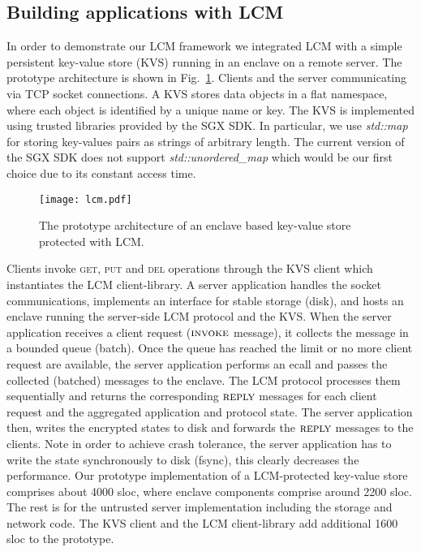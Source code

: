 \documentclass[11pt]{article}
\theoremstyle{plain-boldhead}
\theoremstyle{definition-boldhead}
\newcommand{\str}[1]{\textsc{#1}}
\newcommand{\pp}{LCM\xspace}
\begin{document}
\subsection{Building applications with LCM}
\label{impl:ss:aps}

In order to demonstrate our LCM framework we integrated LCM with a simple
persistent key-value store (KVS) running in an enclave on a remote server. The
prototype architecture is shown in Fig.~\ref{fig:lcm-proto}. Clients and the
server communicating via TCP socket connections.
% 
A KVS stores data objects in a flat namespace, where each object is identified
by a unique name or key.  The KVS is implemented using trusted libraries
provided by the \ac{SGX} SDK. In particular, we use \emph{std::map} for storing
key-values pairs as strings of arbitrary length.  The current version of the
\ac{SGX} SDK does not support \emph{std::unordered\_map} which would be our first
choice due to its constant access time.


\begin{figure}[ht]
    \centering
   \texttt{[image: lcm.pdf]}
    \caption{
    The prototype architecture of an enclave based key-value store protected
    with LCM.}
    \label{fig:lcm-proto}
\end{figure}

Clients invoke \str{get}, \str{put} and \str{del} operations through the KVS
client which instantiates the \pp client-library.  
% 
A server application handles the socket communications, implements an
interface for stable storage (disk), and hosts an enclave running the server-side
LCM protocol and the KVS.
% 
When the server application receives a client request ($\str{invoke}$
message), it collects the message in a bounded queue (batch).  Once the queue
has reached the limit or no more client request are available, the server
application performs an ecall and passes the collected (batched) messages to
the enclave.  The \pp protocol processes them sequentially and returns the
corresponding $\str{reply}$ messages for each client request and the
aggregated application and protocol state.  The server application then,
writes the encrypted states to disk and forwards the $\str{reply}$ messages to
the clients.  Note in order to achieve crash tolerance, the server application
has to write the state synchronously to disk (fsync), this clearly decreases
the performance.
% 
Our prototype implementation of a \pp-protected key-value store comprises
about 4000 sloc, where enclave components comprise around 2200 sloc.  The rest
is for the untrusted server implementation including the storage and network
code.  The KVS client and the \pp client-library add additional 1600 sloc to
the prototype.
\end{document}
